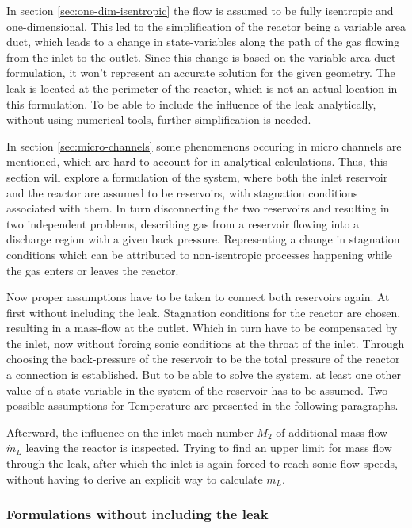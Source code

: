 In section \ref{sec:one-dim-isentropic} the flow is assumed to be fully isentropic and one-dimensional.
This led to the simplification of the reactor being a variable area duct, which leads to a change in state-variables along the path of the gas flowing from the inlet to the outlet.
Since this change is based on the variable area duct formulation, it won't represent an accurate solution for the given geometry.
The leak is located at the perimeter of the reactor, which is not an actual location in this formulation.
To be able to include the influence of the leak analytically, without using numerical tools, further simplification is needed.

In section \ref{sec:micro-channels} some phenomenons occuring in micro channels are mentioned, which are hard to account for in analytical calculations.
Thus, this section will explore a formulation of the system, where both the inlet reservoir and the reactor are assumed to be reservoirs, with stagnation conditions associated with them.
In turn disconnecting the two reservoirs and resulting in two independent problems, describing gas from a reservoir flowing into a discharge region with a given back pressure. 
Representing a change in stagnation conditions which can be attributed to non-isentropic processes happening while the gas enters or leaves the reactor.

Now proper assumptions have to be taken to connect both reservoirs again.
At first without including the leak.
Stagnation conditions for the reactor are chosen, resulting in a mass-flow at the outlet.
Which in turn have to be compensated by the inlet, now without forcing sonic conditions at the throat of the inlet.
Through choosing the back-pressure of the reservoir to be the total pressure of the reactor a connection is established.
But to be able to solve the system, at least one other value of a state variable in the system of the reservoir has to be assumed.
Two possible assumptions for Temperature are presented in the following paragraphs.

Afterward, the influence on the inlet mach number $M_2$ of additional mass flow $\dot{m}_L$ leaving the reactor is inspected.
Trying to find an upper limit for mass flow through the leak, after which the inlet is again forced to reach sonic flow speeds, without having to derive an explicit way to calculate $\dot{m}_L$.

\subsubsection*{Formulations without including the leak}

